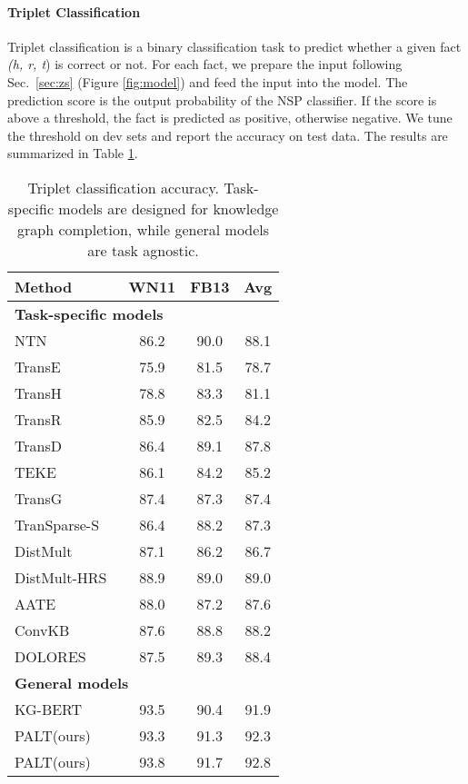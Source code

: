 \documentclass[11pt]{article}
\newcommand{\electricblue}[1]{\textcolor{mediumelectricblue}{#1}}
\newcommand{\method}{\textsc{PALT}}
\newcommand{\texthrt}[1]{\textsl{#1}}
\begin{document}
\paragraph{Triplet Classification}
Triplet classification is a binary classification task to predict whether a given fact \texthrt{(h, r, t}) is correct or not. For each fact, we prepare the input following Sec.~\ref{sec:zs} (Figure \ref{fig:model}) and feed the input into the model. The prediction score is the output probability of the NSP classifier. If the score is above a threshold, the fact is predicted as positive, otherwise negative. We tune the threshold on dev sets and report the accuracy on test data. The results are summarized in Table \ref{tab:tc_results}. 

\begin{table}[!htb]
\centering
\resizebox{\linewidth}{!}
  {
    \begin{tabular}{l|cc|c}
       \toprule
  {{\bf Method}} & {\bf WN11} & {\bf FB13} & {\bf Avg} \\ 
    \hline
    \multicolumn{4}{l}{{\bf Task-specific models}} \\
    \hline
    {NTN~\cite{KB_NL_1}}& 86.2 & 90.0 & 88.1 \\
    {TransE~\cite{TransE}} & 75.9  & 81.5  & 78.7 \\
    {TransH~\cite{TransH}} & 78.8 & 83.3 & 81.1 \\
   {TransR~\cite{TransR}} & 85.9 &82.5  & 84.2 \\
    {TransD~\cite{ji_knowledge_2015}} &86.4  & 89.1 & 87.8 \\
    {TEKE~\cite{wang_text-enhanced_2016}} &86.1  &84.2  & 85.2  \\
    {TransG~\cite{xiao_transg_2016}} &87.4  &87.3  &87.4  \\
    {TranSparse-S~\cite{ji_knowledge_2016}} &86.4  &88.2  &87.3  \\
    {DistMult~\cite{DistMult}} &87.1  &86.2  &86.7  \\
    {DistMult-HRS~\cite{NEURIPS2020_f6185f0e}} &88.9  &89.0  &89.0  \\
    {AATE~\cite{KB_NL_6}} &88.0  &87.2  &87.6  \\
    {ConvKB~\cite{ConvKB}} &87.6  &88.8  &88.2  \\
    {DOLORES~\cite{wang_dolores:_2018}} &87.5  & 89.3   &88.4  \\
    \hline
    \hline
    \multicolumn{4}{l}{{\bf General models}} \\
    \hline
    {KG-BERT~\cite{KGBERT}} & 93.5  & 90.4   & 91.9  \\
\hdashline
    \method (\electricblue{\small ours})& 93.3 & 91.3 & 92.3 \\
\method  (\electricblue{\small ours}) &  93.8 &  91.7 &  92.8 \\
\hline
    \end{tabular}}
    \caption{Triplet classification accuracy. Task-specific models are designed for knowledge graph completion, while general models are task agnostic.}
    \label{tab:tc_results}
\end{table}
\end{document}
